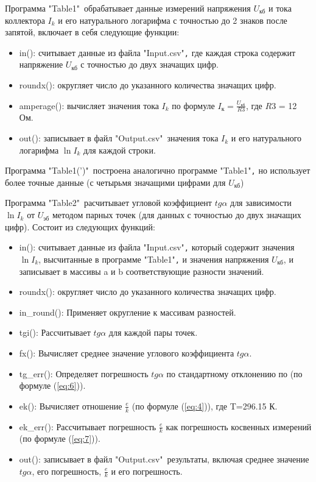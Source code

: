 Программа "Table1"\ обрабатывает данные измерений напряжения $U_{\text{кб}}$ и тока коллектора $I_k$ и его натурального логарифма с точностью до 2 знаков после запятой, включает в себя следующие функции:
\begin{itemize}
\item in(): считывает данные из файла "Input.csv"\verb|,| где каждая строка содержит напряжение $U_{\text{кб}}$ с точностью до двух значащих цифр.
\item roundx(): округляет число до указанного количества значащих цифр.
\item amperage(): вычисляет значения тока $I_k$ по формуле $I_{\text{к}}=\frac{U_{\text{кб}}}{R3}$, где $R3$ = 12 Ом.
\item out(): записывает в файл "Output.csv"\ значения тока $I_k$ и его натурального логарифма $\ln I_k$ для каждой строки.
\end{itemize}

Программа "Table1(')"\ построена аналогично программе "Table1"\verb|,| но использует более точные данные (с четырьмя значащими цифрами для $U_{\text{кб}}$)

Программа "Table2"\ расчитывает угловой коэффициент $tg{\alpha}$ для зависимости $\ln I_k$ от $U_{\text{эб}}$ методом парных точек (для данных с точностью до двух значащих цифр). Состоит из следующих функций:

\begin{itemize}
\item in(): считывает данные из файла "Input.csv"\verb|,| который содержит значения $\ln I_k$, высчитанные в программе "Table1"\verb|,| и значения напряжения $U_{\text{кб}}$, и записывает в массивы a и b соответствующие разности значений.
\item roundx(): округляет число до указанного количества значащих цифр.
\item in\_round(): Применяет округление к массивам разностей.
\item tgi(): Рассчитывает $tg{\alpha}$ для каждой пары точек.
\item fx(): Вычисляет среднее значение углового коэффициента $tg{\alpha}$.
\item tg\_err(): Определяет погрешность $tg{\alpha}$ по стандартному отклонению по (по формуле (\ref{eq:6})).
\item ek(): Вычисляет отношение $\frac{e}{k}$ (по формуле (\ref{eq:4})), где T=296.15 К.
\item ek\_err(): Рассчитывает погрешность $\frac{e}{k}$ как погрешность косвенных измерений (по формуле (\ref{eq:7})).
\item out(): записывает в файл "Output.csv"\ результаты, включая среднее значение $tg{\alpha}$, его погрешность, $\frac{e}{k}$ и его погрешность.
\end{itemize}

